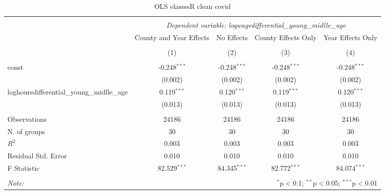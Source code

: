 \documentclass{report}
\begin{document}
\begin{table}[!htbp] \centering
  \caption{OLS elassssR  clean covid}
\begin{tabular}{@{\extracolsep{5pt}}lcccc}
\\[-1.8ex]\hline
\hline \\[-1.8ex]
& \multicolumn{4}{c}{\textit{Dependent variable: logwagedifferential_young_midlle_age}} \
\cr \cline{2-5}
\\[-1.8ex] & \multicolumn{1}{c}{County and Year Effects} & \multicolumn{1}{c}{No Effects} & \multicolumn{1}{c}{County Effects Only} & \multicolumn{1}{c}{Year Effects Only}  \\
\\[-1.8ex] & (1) & (2) & (3) & (4) \\
\hline \\[-1.8ex]
 const & -0.248$^{***}$ & -0.248$^{***}$ & -0.248$^{***}$ & -0.248$^{***}$ \\
& (0.002) & (0.002) & (0.002) & (0.002) \\
 loghoursdifferential_young_midlle_age & 0.119$^{***}$ & 0.120$^{***}$ & 0.119$^{***}$ & 0.120$^{***}$ \\
& (0.013) & (0.013) & (0.013) & (0.013) \\
\hline \\[-1.8ex]
 Observations & 24186 & 24186 & 24186 & 24186 \\
 N. of groups & 30 & 30 & 30 & 30 \\
 $R^2$ & 0.003 & 0.003 & 0.003 & 0.003 \\
 Residual Std. Error & 0.010 & 0.010 & 0.010 & 0.010 \\
 F Statistic & 82.529$^{***}$ & 84.345$^{***}$ & 82.772$^{***}$ & 84.074$^{***}$ \\
\hline
\hline \\[-1.8ex]
\textit{Note:} & \multicolumn{4}{r}{$^{*}$p$<$0.1; $^{**}$p$<$0.05; $^{***}$p$<$0.01} \\
\end{tabular}
\end{table}
\end{document}
